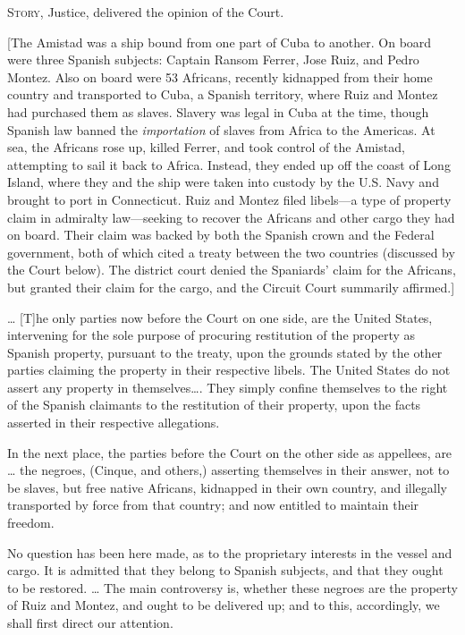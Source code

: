 
\opinion \textsc{Story}, Justice, delivered the opinion of the Court.

[The Amistad was a ship bound from one part of Cuba to another. On board were
three Spanish subjects: Captain Ransom Ferrer, Jose Ruiz, and Pedro Montez.
Also on board were 53 Africans, recently kidnapped from their home country and
transported to Cuba, a Spanish territory, where Ruiz and Montez had purchased
them as slaves. Slavery was legal in Cuba at the time, though Spanish law
banned the \textit{importation} of slaves from Africa to the Americas. At sea,
the Africans rose up, killed Ferrer, and took control of the Amistad,
attempting to sail it back to Africa. Instead, they ended up off the coast of
Long Island, where they and the ship were taken into custody by the U.S. Navy
and brought to port in Connecticut. Ruiz and Montez filed libels---a type of
property claim in admiralty law---seeking to recover the Africans and other
cargo they had on board. Their claim was backed by both the Spanish crown and
the Federal government, both of which cited a treaty between the two countries
(discussed by the Court below). The district court denied the Spaniards' claim
for the Africans, but granted their claim for the cargo, and the Circuit Court
summarily affirmed.]

{\dots} [T]he only parties now before the Court on one side, are the United
States, intervening for the sole purpose of procuring restitution of the
property as Spanish property, pursuant to the treaty, upon the grounds stated
by the other parties claiming the property in their respective libels. The
United States do not assert any property in themselves{\dots}. They simply
confine themselves to the right of the Spanish claimants to the restitution of
their property, upon the facts asserted in their respective allegations.

In the next place, the parties before the Court on the other side as appellees,
are {\dots} the negroes, (Cinque, and others,) asserting themselves in their
answer, not to be slaves, but free native Africans, kidnapped in their own
country, and illegally transported by force from that country; and now entitled
to maintain their freedom.

No question has been here made, as to the proprietary interests in the vessel
and cargo. It is admitted that they belong to Spanish subjects, and that they
ought to be restored. {\dots} The main controversy is, whether these negroes
are the property of Ruiz and Montez, and ought to be delivered up; and to this,
accordingly, we shall first direct our attention.


